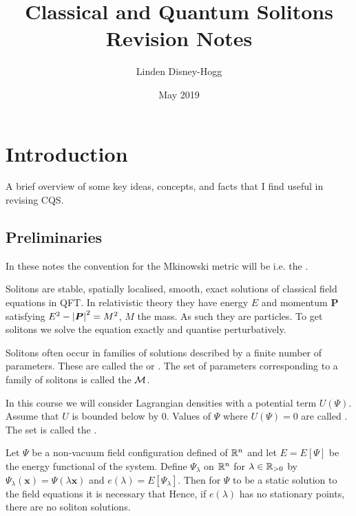 \documentclass{article}
\title{Classical and Quantum Solitons Revision Notes}
\author{Linden Disney-Hogg}
\date{May 2019}
\begin{document}
\maketitle
\tableofcontents

\section{Introduction}
A brief overview of some key ideas, concepts, and facts that I find useful in revising CQS. 
\subsection{Preliminaries}

\begin{definition}
In these notes the convention for the Mkinowski metric will be 
i.e. the . 
\end{definition}

\begin{definition}[Soliton]
Solitons are stable, spatially localised, smooth, exact solutions of classical field equations in QFT. In relativistic theory they have energy $E$ and momentum $\bm{P}$ satisfying $E^2-\left\lvert \bm{P} \right\rvert^2 = M^2$, $M$ the mass. As such they are particles. To get solitons we solve the equation exactly and quantise perturbatively.
\end{definition}

\begin{definition}[Moduli]
Solitons often occur in families of solutions described by a finite number of parameters. These are called the  or . The set of parameters corresponding to a family of solitons is called the  $\mathcal{M}$.
\end{definition}

\begin{definition}[Vacuum]
In this course we will consider Lagrangian densities with a potential term $U(\Psi)$. Assume that $U$ is bounded below by $0$. Values of $\Psi$ where $U(\Psi) = 0$ are called . The set 
is called the . 
\end{definition}

\begin{theorem}
Let $\Psi$ be a non-vacuum field configuration defined of $\mathbb{R}^n$ and let $E = E[\Psi]$ be the energy functional of the system. Define $\Psi_\lambda$ on $\mathbb{R}^n$ for $\lambda\in\mathbb{R}_{>0}$ by $\Psi_\lambda(\bm{x}) = \Psi(\lambda\bm{x})$ and $e(\lambda) = E[\Psi_\lambda]$. Then for $\Psi$ to be a static solution to the field equations it is necessary that 
Hence, if $e(\lambda)$ has no stationary points, there are no soliton solutions. 
\end{theorem}
\end{document}
